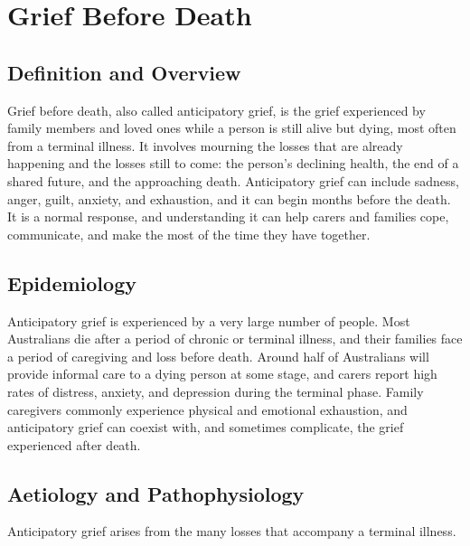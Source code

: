 \chapter{Grief Before Death}

\section*{Definition and Overview}
Grief before death, also called anticipatory grief, is the grief experienced by family members and loved ones while a person is still alive but dying, most often from a terminal illness. It involves mourning the losses that are already happening and the losses still to come: the person's declining health, the end of a shared future, and the approaching death. Anticipatory grief can include sadness, anger, guilt, anxiety, and exhaustion, and it can begin months before the death. It is a normal response, and understanding it can help carers and families cope, communicate, and make the most of the time they have together.

\section*{Epidemiology}
Anticipatory grief is experienced by a very large number of people. Most Australians die after a period of chronic or terminal illness, and their families face a period of caregiving and loss before death. Around half of Australians will provide informal care to a dying person at some stage, and carers report high rates of distress, anxiety, and depression during the terminal phase. Family caregivers commonly experience physical and emotional exhaustion, and anticipatory grief can coexist with, and sometimes complicate, the grief experienced after death.

\section*{Aetiology and Pathophysiology}
Anticipatory grief arises from the many losses that accompany a terminal illness.

